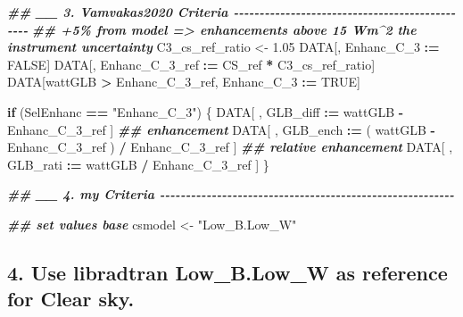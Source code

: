\documentclass[
  10pt,
  a4paper,oneside]{article}
\newenvironment{Shaded}{\begin{snugshade}}{\end{snugshade}}
\newcommand{\ConstantTok}[1]{\textcolor[rgb]{0.56,0.35,0.01}{#1}}
\newcommand{\ControlFlowTok}[1]{\textcolor[rgb]{0.13,0.29,0.53}{\textbf{#1}}}
\newcommand{\DocumentationTok}[1]{\textcolor[rgb]{0.56,0.35,0.01}{\textbf{\textit{#1}}}}
\newcommand{\FloatTok}[1]{\textcolor[rgb]{0.00,0.00,0.81}{#1}}
\newcommand{\NormalTok}[1]{#1}
\newcommand{\OtherTok}[1]{\textcolor[rgb]{0.56,0.35,0.01}{#1}}
\newcommand{\SpecialCharTok}[1]{\textcolor[rgb]{0.81,0.36,0.00}{\textbf{#1}}}
\newcommand{\StringTok}[1]{\textcolor[rgb]{0.31,0.60,0.02}{#1}}
\begin{document}
\begin{Shaded}
\begin{Highlighting}[]
\DocumentationTok{\#\# \_\_ 3. Vamvakas2020  Criteria  {-}{-}{-}{-}{-}{-}{-}{-}{-}{-}{-}{-}{-}{-}{-}{-}{-}{-}{-}{-}{-}{-}{-}{-}{-}{-}{-}{-}{-}{-}{-}{-}{-}{-}{-}{-}{-}{-}{-}{-}{-}{-}{-}{-}{-}{-}{-}}
\DocumentationTok{\#\# +5\% from model =\textgreater{} enhancements above 15 Wm\^{}2 the instrument uncertainty}
\NormalTok{C3\_cs\_ref\_ratio }\OtherTok{\textless{}{-}} \FloatTok{1.05}
\NormalTok{DATA[, Enhanc\_C\_3 }\SpecialCharTok{:=} \ConstantTok{FALSE}\NormalTok{]}
\NormalTok{DATA[, Enhanc\_C\_3\_ref }\SpecialCharTok{:=}\NormalTok{ CS\_ref }\SpecialCharTok{*}\NormalTok{ C3\_cs\_ref\_ratio]}
\NormalTok{DATA[wattGLB }\SpecialCharTok{\textgreater{}}\NormalTok{ Enhanc\_C\_3\_ref,}
\NormalTok{     Enhanc\_C\_3 }\SpecialCharTok{:=} \ConstantTok{TRUE}\NormalTok{]}

\ControlFlowTok{if}\NormalTok{ (SelEnhanc }\SpecialCharTok{==} \StringTok{"Enhanc\_C\_3"}\NormalTok{) \{}
\NormalTok{    DATA[ , GLB\_diff }\SpecialCharTok{:=}\NormalTok{   wattGLB }\SpecialCharTok{{-}}\NormalTok{ Enhanc\_C\_3\_ref                    ] }\DocumentationTok{\#\# enhancement}
\NormalTok{    DATA[ , GLB\_ench }\SpecialCharTok{:=}\NormalTok{ ( wattGLB }\SpecialCharTok{{-}}\NormalTok{ Enhanc\_C\_3\_ref ) }\SpecialCharTok{/}\NormalTok{ Enhanc\_C\_3\_ref ] }\DocumentationTok{\#\# relative enhancement}
\NormalTok{    DATA[ , GLB\_rati }\SpecialCharTok{:=}\NormalTok{   wattGLB }\SpecialCharTok{/}\NormalTok{ Enhanc\_C\_3\_ref                    ]}
\NormalTok{\}}



\DocumentationTok{\#\# \_\_ 4. my  Criteria  {-}{-}{-}{-}{-}{-}{-}{-}{-}{-}{-}{-}{-}{-}{-}{-}{-}{-}{-}{-}{-}{-}{-}{-}{-}{-}{-}{-}{-}{-}{-}{-}{-}{-}{-}{-}{-}{-}{-}{-}{-}{-}{-}{-}{-}{-}{-}{-}{-}{-}{-}{-}{-}{-}{-}{-}{-}}

\DocumentationTok{\#\# set values base}
\NormalTok{csmodel }\OtherTok{\textless{}{-}} \StringTok{"Low\_B.Low\_W"}
\end{Highlighting}
\end{Shaded}

\hypertarget{use-libradtran-low_b.low_w-as-reference-for-clear-sky.}{%
\subsection{\texorpdfstring{4. Use libradtran \textbf{Low\_B.Low\_W} as reference for Clear sky.}{4. Use libradtran Low\_B.Low\_W as reference for Clear sky.}}\label{use-libradtran-low_b.low_w-as-reference-for-clear-sky.}}
\end{document}
